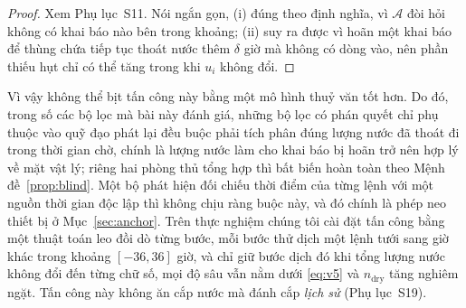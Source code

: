 \begin{proof}
Xem Phụ lục~S11. Nói ngắn gọn, (i) đúng theo định nghĩa, vì $\mathcal{A}$ đòi
hỏi không có khai báo nào bên trong khoảng; (ii) suy ra được vì hoãn một khai
báo để thùng chứa tiếp tục thoát nước thêm $\delta$ giờ mà không có dòng vào,
nên phần thiếu hụt chỉ có thể tăng trong khi $u_i$ không đổi.
\end{proof}

Vì vậy không thể bịt tấn công này bằng một mô hình thuỷ văn tốt hơn. Do đó, trong số các bộ lọc mà bài này đánh giá, những bộ lọc có phán quyết chỉ phụ
thuộc vào quỹ đạo phát lại đều buộc phải tích phân đúng lượng nước đã thoát đi trong
thời gian chờ, chính là lượng nước làm cho khai báo bị hoãn trở nên hợp lý về mặt vật
lý; riêng hai phòng thủ tổng hợp thì bất biến hoàn toàn theo
Mệnh đề~\ref{prop:blind}. Một bộ phát hiện đối chiếu thời điểm của từng lệnh với
một nguồn thời gian độc lập thì không chịu ràng buộc này, và đó chính là phép neo
thiết bị ở Mục~\ref{sec:anchor}. Trên
thực nghiệm chúng tôi cài đặt tấn công bằng một thuật toán leo đồi dò từng bước, mỗi bước thử dịch một lệnh tưới sang giờ khác trong khoảng
$[-36,36]$ giờ, và chỉ giữ bước dịch đó khi tổng lượng nước không đổi đến từng
chữ số, mọi độ sâu vẫn nằm dưới \eqref{eq:v5} và $n_{\mathrm{dry}}$ tăng nghiêm
ngặt. Tấn công này không ăn cắp nước mà đánh cắp \emph{lịch sử} (Phụ lục~S19).
